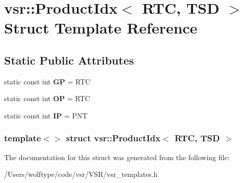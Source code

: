 \hypertarget{structvsr_1_1_product_idx_3_01_r_t_c_00_01_t_s_d_01_4}{\section{vsr\-:\-:Product\-Idx$<$ R\-T\-C, T\-S\-D $>$ Struct Template Reference}
\label{structvsr_1_1_product_idx_3_01_r_t_c_00_01_t_s_d_01_4}
}
\subsection*{Static Public Attributes}
\begin{DoxyCompactItemize}
\item 
\hypertarget{structvsr_1_1_product_idx_3_01_r_t_c_00_01_t_s_d_01_4_a09780eabc5876ec1435db918ba6e3b3d}{static const int {\bfseries G\-P} = R\-T\-C}\label{structvsr_1_1_product_idx_3_01_r_t_c_00_01_t_s_d_01_4_a09780eabc5876ec1435db918ba6e3b3d}

\item 
\hypertarget{structvsr_1_1_product_idx_3_01_r_t_c_00_01_t_s_d_01_4_a27c8182a47f7aa8d20f86211abe4d059}{static const int {\bfseries O\-P} = R\-T\-C}\label{structvsr_1_1_product_idx_3_01_r_t_c_00_01_t_s_d_01_4_a27c8182a47f7aa8d20f86211abe4d059}

\item 
\hypertarget{structvsr_1_1_product_idx_3_01_r_t_c_00_01_t_s_d_01_4_afd463a415ee16cf6daf20b648b273276}{static const int {\bfseries I\-P} = P\-N\-T}\label{structvsr_1_1_product_idx_3_01_r_t_c_00_01_t_s_d_01_4_afd463a415ee16cf6daf20b648b273276}

\end{DoxyCompactItemize}
\subsubsection*{template$<$$>$ struct vsr\-::\-Product\-Idx$<$ R\-T\-C, T\-S\-D $>$}



The documentation for this struct was generated from the following file\-:\begin{DoxyCompactItemize}
\item 
/\-Users/wolftype/code/vsr/\-V\-S\-R/vsr\-\_\-templates.\-h\end{DoxyCompactItemize}
